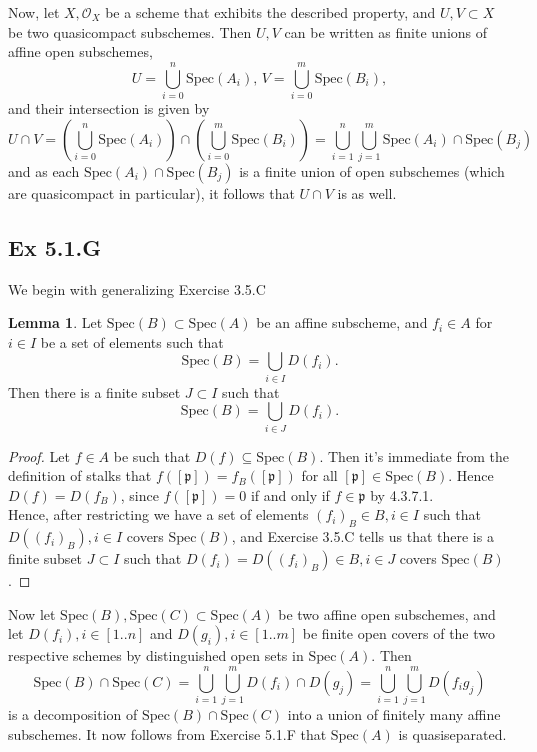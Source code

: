 \documentclass{article}
\theoremstyle{definition}
\newtheorem{lemma}[theorem]{Lemma}
\newcommand{\oo}{\mathcal{O}}
\newcommand{\Spec}{\text{Spec}}
\begin{document}
Now, let $X, \oo_{X}$ be a scheme that exhibits the described property, and $U,
V \subset X$ be two quasicompact subschemes. Then $U, V$ can be written as
finite unions of affine open subschemes,
\[
	U = \bigcup_{i=0}^{n} \Spec(A_i),\, 
	V = \bigcup_{i=0}^{m} \Spec(B_i),
\] 
and their intersection is given by
\[
	U \cap V 
	= 
	\left(\bigcup_{i=0}^{n} \Spec(A_i)\right)
	\cap
	\left(\bigcup_{i=0}^{m} \Spec(B_i)\right)
	=
	\bigcup_{i = 1}^{n}
	\bigcup_{j = 1}^{m}
	\Spec(A_i) \cap \Spec(B_j)
\] 
and as each $\Spec(A_i) \cap \Spec(B_j)$ is a finite union of open subschemes
(which are quasicompact in particular), it follows that $U \cap V$ is as
well.

\subsection*{Ex 5.1.G}

We begin with generalizing Exercise 3.5.C

\begin{lemma}
	Let $\Spec(B) \subset \Spec(A)$ be an affine subscheme, and $f_i \in A$
	for $i \in I$ be a set of elements such that 
	\[
		\Spec(B) = \bigcup_{i \in I} D(f_i).
	\] 
	Then there is a finite subset $J \subset I$ such that 
	\[
		\Spec(B) = \bigcup_{i \in J} D(f_i).
	\] 
\end{lemma}
\begin{proof}
	Let $f \in A$ be such that $D(f) \subseteq \Spec(B)$. Then it's immediate
	from the definition of stalks that $f([\mathfrak{p}]) =
	f_{B}([\mathfrak{p}])$ for all $[\mathfrak{p}] \in \Spec(B)$. Hence $D(f) =
	D(f_{B})$, since $f([\mathfrak{p}]) = 0$ if and only if $f \in
	\mathfrak{p}$ by 4.3.7.1. \\

	Hence, after restricting we have a set of elements $(f_i)_B \in B, i \in I$
	such that $D((f_i)_{B}), i \in I$ covers $\Spec(B)$, and Exercise 3.5.C
	tells us that there is a finite subset $J \subset I$ such that $D(f_i) =
	D((f_i)_{B}) \in B, i \in J$ covers $\Spec(B)$.
\end{proof}

Now let $\Spec(B), \Spec(C) \subset \Spec(A)$ be two affine open subschemes,
and let $D(f_i), i \in [1..n]$ and $D(g_i), i \in [1..m]$ be finite open covers
of the two respective schemes by distinguished open sets in $\Spec(A)$. Then
\[
	\Spec(B) \cap \Spec(C)
	=
	\bigcup_{i = 1}^{n}
	\bigcup_{j = 1}^{m}
	D(f_i) \cap D(g_j)
	=
	\bigcup_{i = 1}^{n}
	\bigcup_{j = 1}^{m}
	D(f_ig_j)
\] 
is a decomposition of $\Spec(B) \cap \Spec(C)$ into a union of finitely many
affine subschemes. It now follows from Exercise 5.1.F that $\Spec(A)$ is
quasiseparated.
\end{document}
